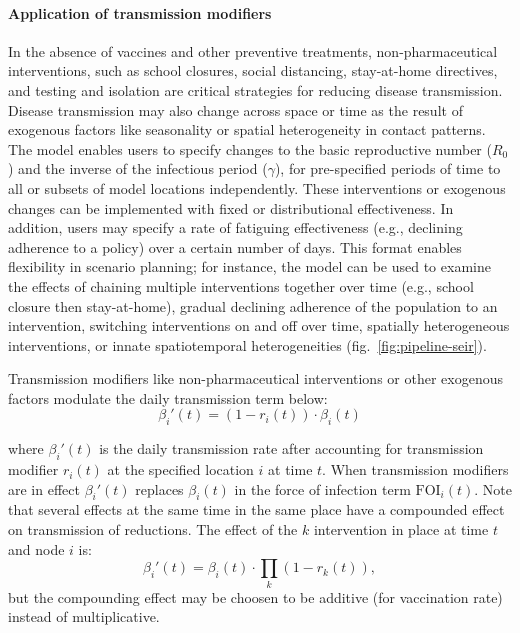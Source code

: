 {\paragraph{Application of transmission modifiers}
In the absence of vaccines and other preventive treatments, non-pharmaceutical interventions, such as school closures, social distancing, stay-at-home directives, and testing and isolation are critical strategies for reducing disease transmission. Disease transmission may also change across space or time as the result of exogenous factors like seasonality or spatial heterogeneity in contact patterns. The model enables users to specify changes to the basic reproductive number ($R_0$) and the inverse of the infectious period ($\gamma$), for pre-specified periods of time to all or subsets of model locations independently. These interventions or exogenous changes can be implemented with fixed or distributional effectiveness. In addition, users may specify a rate of fatiguing effectiveness (e.g., declining adherence to a policy) over a certain number of days. This format enables flexibility in scenario planning; for instance, the model can be used to examine the effects of chaining multiple interventions together over time (e.g., school closure then stay-at-home), gradual declining adherence of the population to an intervention, switching interventions on and off over time, spatially heterogeneous interventions, or innate spatiotemporal heterogeneities (fig.~\ref{fig:pipeline-seir}).

Transmission modifiers like non-pharmaceutical interventions or other exogenous factors modulate the daily transmission term below:
\begin{equation}
\beta _i'(t)=\left(1-r_i(t)\right)\cdot \beta_i (t)
\end{equation}

where $\beta_i'(t)$ is the daily transmission rate after accounting for transmission modifier $r_i(t)$ at the specified location $i$ at time $t$. When transmission modifiers are in effect $\beta_i'(t)$ replaces $\beta_i(t)$ in the force of infection term $\text{FOI}_i(t)$.
Note that several effects at the same time in the same place have a compounded effect on transmission of reductions. The effect of the $k$ intervention in place at time $t$ and node $i$ is:
\begin{equation}
	\beta_i'(t) =  \beta_i(t) \cdot  \prod_k \left(1-r_k(t) \right), \label{eq:npi_comp}
\end{equation}
but the compounding effect may be choosen to be additive (\eg for vaccination rate) instead of multiplicative.

}
